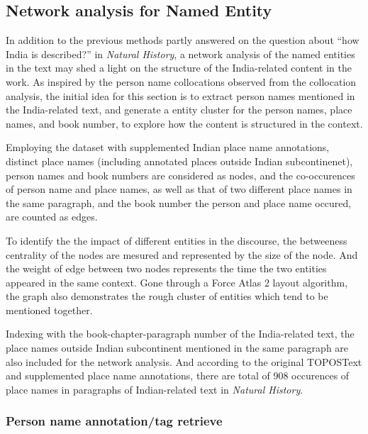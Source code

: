 \documentclass[
  12pt,
]{article}
\begin{document}
\hypertarget{network-analysis-for-named-entity}{%
\subsection{Network analysis for Named
Entity}\label{network-analysis-for-named-entity}}

In addition to the previous methods partly answered on the question
about ``how India is described?'' in \emph{Natural History}, a network
analysis of the named entities in the text may shed a light on the
structure of the India-related content in the work. As inspired by the
person name collocations observed from the collocation analysis, the
initial idea for this section is to extract person names mentioned in
the India-related text, and generate a entity cluster for the person
names, place names, and book number, to explore how the content is
structured in the context.

Employing the dataset with supplemented Indian place name annotations,
distinct place names (including annotated places outside Indian
subcontinenet), person names and book numbers are considered as nodes,
and the co-occurences of person name and place names, as well as that of
two different place names in the same paragraph, and the book number the
person and place name occured, are counted as edges.

To identify the the impact of different entities in the discourse, the
betweeness centrality of the nodes are mesured and represented by the
size of the node. And the weight of edge between two nodes represents
the time the two entities appeared in the same context. Gone through a
Force Atlas 2 layout algorithm, the graph also demonstrates the rough
cluster of entities which tend to be mentioned together.

Indexing with the book-chapter-paragraph number of the India-related
text, the place names outside Indian subcontinent mentioned in the same
paragraph are also included for the network analysis. And according to
the original TOPOSText and supplemented place name annotations, there
are total of 908 occurences of place names in paragraphs of
Indian-related text in \emph{Natural History}.

\hypertarget{person-name-annotationtag-retrieve}{%
\subsubsection{Person name annotation/tag
retrieve}\label{person-name-annotationtag-retrieve}}
\end{document}
